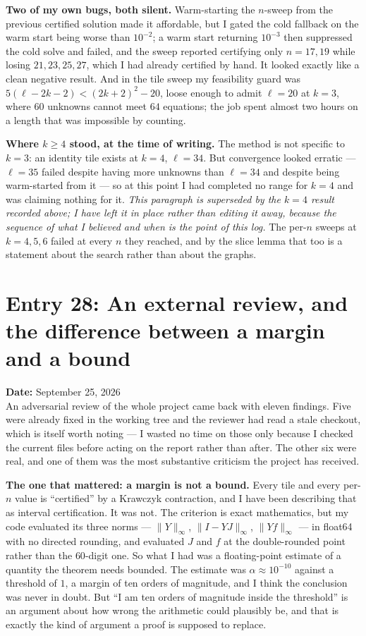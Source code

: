 \documentclass[12pt]{article}
\begin{document}
\textbf{Two of my own bugs, both silent.} Warm-starting the $n$-sweep from the
previous certified solution made it affordable, but I gated the cold fallback on
the warm start being worse than $10^{-2}$; a warm start returning $10^{-3}$ then
suppressed the cold solve and failed, and the sweep reported certifying only
$n=17,19$ while losing $21,23,25,27$, which I had already certified by hand. It
looked exactly like a clean negative result. And in the tile sweep my
feasibility guard was $5(\ell-2k-2)<(2k+2)^2-20$, loose enough to admit
$\ell=20$ at $k=3$, where $60$ unknowns cannot meet $64$ equations; the job spent
almost two hours on a length that was impossible by counting.

\textbf{Where $k\ge4$ stood, at the time of writing.} The method is not specific
to $k=3$: an identity tile exists at $k=4$, $\ell=34$. But convergence looked
erratic --- $\ell=35$ failed despite having more unknowns than $\ell=34$ and
despite being warm-started from it --- so at this point I had completed no range
for $k=4$ and was claiming nothing for it. \emph{This paragraph is superseded by
the $k=4$ result recorded above; I have left it in place rather than editing it
away, because the sequence of what I believed and when is the point of this
log.} The per-$n$ sweeps at $k=4,5,6$ failed at every $n$ they reached, and by
the slice lemma that too is a statement about the search rather than about the
graphs.


\clearpage
\section*{Entry 28: An external review, and the difference between a margin and a bound}
\textbf{Date:} September 25, 2026\\

An adversarial review of the whole project came back with eleven findings. Five
were already fixed in the working tree and the reviewer had read a stale
checkout, which is itself worth noting --- I wasted no time on those only because
I checked the current files before acting on the report rather than after. The
other six were real, and one of them was the most substantive criticism the
project has received.

\textbf{The one that mattered: a margin is not a bound.} Every tile and every
per-$n$ value is ``certified'' by a Krawczyk contraction, and I have been
describing that as interval certification. It was not. The criterion is exact
mathematics, but my code evaluated its three norms --- $\|Y\|_\infty$,
$\|I-YJ\|_\infty$, $\|Yf\|_\infty$ --- in float64 with no directed rounding, and
evaluated $J$ and $f$ at the double-rounded point rather than the $60$-digit one.
So what I had was a floating-point estimate of a quantity the theorem needs
bounded. The estimate was $\alpha\approx10^{-10}$ against a threshold of $1$, a
margin of ten orders of magnitude, and I think the conclusion was never in
doubt. But ``I am ten orders of magnitude inside the threshold'' is an argument
about how wrong the arithmetic could plausibly be, and that is exactly the kind
of argument a proof is supposed to replace.
\end{document}
